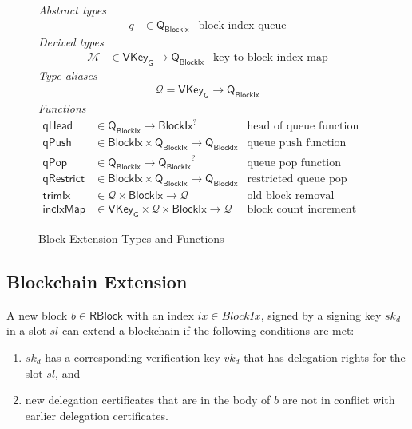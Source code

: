 \documentclass[11pt,a4paper]{article}
\newcommand{\fun}[1]{\mathsf{#1}}
\newcommand{\type}[1]{\mathsf{#1}}
\newcommand{\BlockIx}{\type{BlockIx}}
\newcommand{\RBlock}{\type{RBlock}}
\newcommand{\Queue}{\type{Q}}
\newcommand{\VKeyGen}{\type{VKey_G}}
\newcommand{\signmapname}{\mathcal{M}}
\newcommand{\trimixname}{trimIx}
\newcommand{\incixmapname}{incIxMap}
\newcommand{\qrestrname}{qRestrict}
\newcommand{\qpopname}{qPop}
\newcommand{\totalf}{\to}
\newcommand{\mapqueue}{\mathcal{Q}}
\begin{document}
\begin{figure}
  \emph{Abstract types}
  \begin{align*}
    q & \in \Queue_\BlockIx  & \text{block index queue}
  \end{align*}
  \emph{Derived types}
  \begin{align*}
    \signmapname & \in \VKeyGen \totalf \Queue_\BlockIx & \text{key to block index map}
  \end{align*}
  \emph{Type aliases}
  \begin{align*}
    \mapqueue = \VKeyGen \totalf \Queue_\BlockIx
  \end{align*}
  \emph{Functions}
  \begin{align*}
    \text{$\fun{qHead}$} & \in \Queue_\BlockIx \totalf \BlockIx^? & \text{head of queue function} \\
    \text{$\fun{qPush}$} & \in \BlockIx \times \Queue_\BlockIx \totalf \Queue_\BlockIx
      & \text{queue push function} \\
    \text{$\fun{\qpopname}$} & \in \Queue_\BlockIx \totalf {\Queue_\BlockIx}^?
      & \text{queue pop function} \\
    \fun{\qrestrname} & \in \BlockIx \times \Queue_\BlockIx \totalf \Queue_\BlockIx
      & \text{restricted queue pop function} \\
    \text{$\fun{\trimixname}$} & \in \mapqueue \times \BlockIx \totalf \mapqueue
      & \text{old block removal function} \\
    \text{$\fun{\incixmapname}$} & \in \VKeyGen \times \mapqueue \times \BlockIx \totalf \mapqueue
      & \text{block count increment function}
  \end{align*}
  \caption{Block Extension Types and Functions}
  \label{fig:block-ext-types-funs}
\end{figure}


\subsection{Blockchain Extension}
\label{sec:chain-extension}

A new block $b \in \RBlock$ with an index $ix \in BlockIx$, signed by a
signing key $sk_d$ in a slot $sl$ can extend a blockchain if the following
conditions are met:
%
\begin{enumerate}
\item $sk_d$ has a corresponding verification key $vk_d$ that has delegation
  rights for the slot $sl$, and
\item new delegation certificates that are in the body of $b$ are not in
  conflict with earlier delegation certificates.
\end{enumerate}
\end{document}
